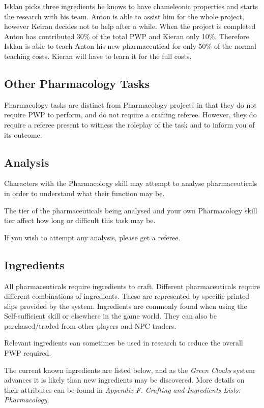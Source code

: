 Isklan picks three ingredients he knows to have chameleonic properties and starts the research with his team. Anton is able to assist him for the whole project, however Keiran decides not to help after a while. When the project is completed Anton has contributed 30\% of the total PWP and Kieran only 10\%. Therefore Isklan is able to teach Anton his new pharmaceutical for only 50\% of the normal teaching costs. Kieran will have to learn it for the full costs.

\subsection{Other Pharmacology Tasks}

Pharmacology tasks are distinct from Pharmacology projects in that they do not require PWP to perform, and do not require a crafting referee. However, they do require a referee present to witness the roleplay of the task and to inform you of its outcome.

\subsection{Analysis}

Characters with the Pharmacology skill may attempt to analyse pharmaceuticals in order to understand what their function may be.

The tier of the pharmaceuticals being analysed and your own Pharmacology skill tier affect how long or difficult this task may be.

If you wish to attempt any analysis, please get a referee.

\subsection{Ingredients}

All pharmaceuticals require ingredients to craft. Different pharmaceuticals require different combinations of ingredients. These are represented by specific printed slips provided by the system. Ingredients are commonly found when using the Self-sufficient skill or elsewhere in the game world. They can also be purchased/traded from other players and NPC traders.

Relevant ingredients can sometimes be used in research to reduce the overall PWP required.

The current known ingredients are listed below, and as the \textit{Green Cloaks} system advances it is likely than new ingredients may be discovered. More details on their attributes can be found in \textit{Appendix F. Crafting} \textit{and Ingredients Lists: Pharmacology}\textit{.}

